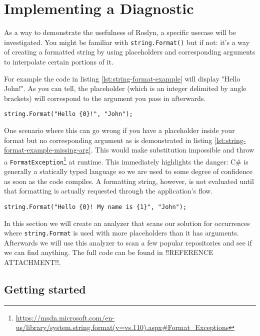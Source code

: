 \chapter{Implementing a Diagnostic}
\label{ch:diagnostic}

As a way to demonstrate the usefulness of Roslyn, a specific usecase will be investigated. You might be familiar with \texttt{string.Format()} but if not: it's a way of creating a formatted string by using placeholders and corresponding arguments to interpolate certain portions of it. 

For example the code in listing \ref{lst:string-format-example} will display "Hello John!". As you can tell, the placeholder (which is an integer delimited by angle brackets) will correspond to the argument you pass in afterwards.

\begin{lstlisting}[label={lst:string-format-example}]
string.Format("Hello {0}!", "John");
\end{lstlisting}

One scenario where this can go wrong if you have a placeholder inside your format but no corresponding argument as is demonstrated in listing \ref{lst:string-format-example-missing-arg}. This would make substitution impossible and throw a \texttt{FormatException}\footnote{\url{https://msdn.microsoft.com/en-us/library/system.string.format(v=vs.110).aspx\#Format_Exceptions}} at runtime. This immediately highlights the danger: C\# is generally a statically typed language so we are used to some degree of confidence as soon as the code compiles. A formatting string, however, is not evaluated until that formatting is actually requested through the application's flow. 

\begin{lstlisting}[label={lst:string-format-example-missing-arg}]
string.Format("Hello {0}! My name is {1}", "John");
\end{lstlisting}

In this section we will create an analyzer that scans our solution for occurrences where \texttt{string.Format} is used with more placeholders than it has arguments. Afterwards we will use this analyzer to scan a few popular repositories and see if we can find anything. The full code can be found in !!REFERENCE ATTACHMENT!!.

\section{Getting started}
\label{sec:diagnostic-getting-started}

